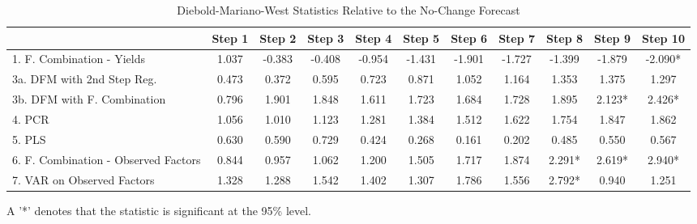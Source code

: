 \documentclass[11pt]{article}
\begin{document}
\clearpage
\begin{table}   \caption{Diebold-Mariano-West Statistics Relative to the No-Change Forecast}                                                                                             
\center                                                                                                     
\begin{tabular}{|l|c|c|c|c|c|c|c|c|c|c|}                                                                    
\hline                                                                                                      
&Step 1 &Step 2 &Step 3 &Step 4 &Step 5 &Step 6 &Step 7 &Step 8 &Step 9 &Step 10\\                          
\hline                                                                                                      
1. F. Combination - Yields          &1.037&-0.383&-0.408&-0.954&-1.431&-1.901&-1.727&-1.399&-1.879&-2.090*\\
3a. DFM with 2nd Step Reg.          &0.473&0.372&0.595&0.723&0.871&1.052&1.164&1.353&1.375&1.297\\          
3b. DFM with F. Combination         &0.796&1.901&1.848&1.611&1.723&1.684&1.728&1.895&2.123*&2.426*\\        
4. PCR                              &1.056&1.010&1.123&1.281&1.384&1.512&1.622&1.754&1.847&1.862\\          
5. PLS                              &0.630&0.590&0.729&0.424&0.268&0.161&0.202&0.485&0.550&0.567\\          
6. F. Combination - Observed Factors&0.844&0.957&1.062&1.200&1.505&1.717&1.874&2.291*&2.619*&2.940*\\       
7. VAR on Observed Factors          &1.328&1.288&1.542&1.402&1.307&1.786&1.556&2.792*&0.940&1.251\\         
\hline                                                                                                      
\end{tabular}
\footnotesize A '*' denotes that the statistic is significant at the 95\% level.                                                                                               
\end{table}  
\end{document}
